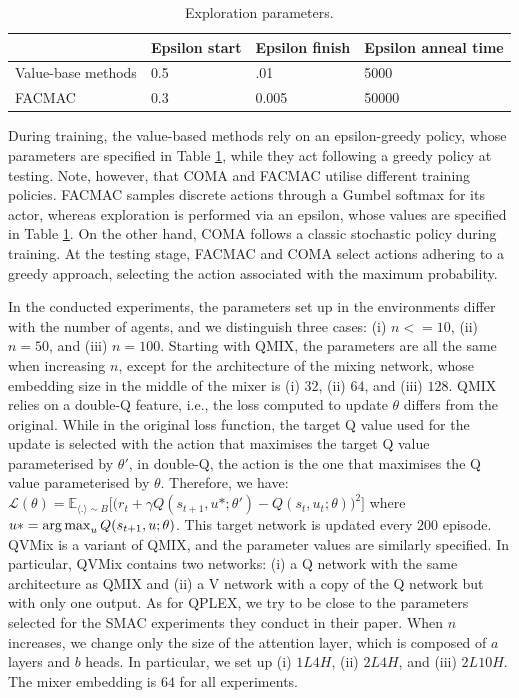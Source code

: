 \begin{table}
    
    \centering
    \setlength\tabcolsep{4.5pt}
    \begin{tabular}{llll}
    \toprule
    & Epsilon start & Epsilon finish & Epsilon anneal time \\
    \midrule
    Value-base methods & 0.5  & .01 & 5000\\
    FACMAC & 0.3 & 0.005 & 50000 \\
    \bottomrule
    \end{tabular}
    \caption{Exploration parameters.}
    \label{tab:exloration_param}
\end{table}

During training, the value-based methods rely on an epsilon-greedy policy, whose parameters are specified in Table \ref{tab:exloration_param}, while they act following a greedy policy at testing.
Note, however, that COMA and FACMAC utilise different training policies.
FACMAC samples discrete actions through a Gumbel softmax for its actor, whereas exploration is performed via an epsilon, whose values are specified in Table \ref{tab:exloration_param}.
On the other hand, COMA follows a classic stochastic policy during training.
At the testing stage, FACMAC and COMA select actions adhering to a greedy approach, selecting the action associated with the maximum probability.

In the conducted experiments, the parameters set up in the environments differ with the number of agents, and we distinguish three cases: (i) $n<=10$, (ii) $n=50$, and (iii) $n=100$.
Starting with QMIX, the parameters are all the same when increasing $n$, except for the architecture of the mixing network, whose embedding size in the middle of the mixer is (i) $32$, (ii) $64$, and (iii) $128$.
QMIX relies on a double-Q feature, i.e., the loss computed to update $\theta$ differs from the original.
While in the original loss function, the target Q value used for the update is selected with the action that maximises the target Q value parameterised by $\theta'$, in double-Q, the action is the one that maximises the Q value parameterised by $\theta$.
Therefore, we have: $\mathcal{L}(\theta) = \mathbb{E}_{\langle . \rangle\sim B} \big[\big(r_{t} + \gamma Q(s_{t+1}, u*; \theta')- Q(s_{t}, u_{t}; \theta)\big)^{2}\big]$ where $u*=\operatorname*{arg\,max}_u Q(s_{t+1}, u; \theta)$.
This target network is updated every $200$ episode.
QVMix is a variant of QMIX, and the parameter values are similarly specified.
In particular, QVMix contains two networks: (i) a Q network with the same architecture as QMIX and (ii) a V network with a copy of the Q network but with only one output.
As for QPLEX, we try to be close to the parameters selected for the SMAC experiments they conduct in their paper.
When $n$ increases, we change only the size of the attention layer, which is composed of $a$ layers and $b$ heads.
In particular, we set up (i) $1L4H$, (ii) $2L4H$, and (iii) $2L10H$.
The mixer embedding is $64$ for all experiments.

